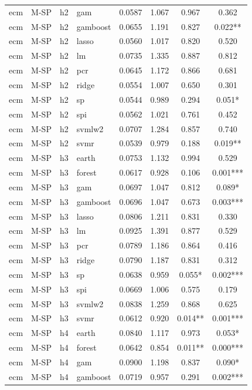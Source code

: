 \begin{ThreePartTable}
\begin{longtable}[t]{llclcccc}
ecm & M-SP & h2 & gam & 0.0587 & 1.067 & 0.967 & 0.362\\
ecm & M-SP & h2 & gamboost & 0.0655 & 1.191 & 0.827 & 0.022**\\
ecm & M-SP & h2 & lasso & 0.0560 & 1.017 & 0.820 & 0.520\\
ecm & M-SP & h2 & lm & 0.0735 & 1.335 & 0.887 & 0.812\\
ecm & M-SP & h2 & pcr & 0.0645 & 1.172 & 0.866 & 0.681\\
ecm & M-SP & h2 & ridge & 0.0554 & 1.007 & 0.650 & 0.301\\
ecm & M-SP & h2 & sp & 0.0544 & 0.989 & 0.294 & 0.051*\\
ecm & M-SP & h2 & spi & 0.0562 & 1.021 & 0.761 & 0.452\\
ecm & M-SP & h2 & svmlw2 & 0.0707 & 1.284 & 0.857 & 0.740\\
ecm & M-SP & h2 & svmr & 0.0539 & 0.979 & 0.188 & 0.019**\\
\addlinespace
ecm & M-SP & h3 & earth & 0.0753 & 1.132 & 0.994 & 0.529\\
ecm & M-SP & h3 & forest & 0.0617 & 0.928 & 0.106 & 0.001***\\
ecm & M-SP & h3 & gam & 0.0697 & 1.047 & 0.812 & 0.089*\\
ecm & M-SP & h3 & gamboost & 0.0696 & 1.047 & 0.673 & 0.003***\\
ecm & M-SP & h3 & lasso & 0.0806 & 1.211 & 0.831 & 0.330\\
ecm & M-SP & h3 & lm & 0.0925 & 1.391 & 0.877 & 0.529\\
ecm & M-SP & h3 & pcr & 0.0789 & 1.186 & 0.864 & 0.416\\
ecm & M-SP & h3 & ridge & 0.0790 & 1.187 & 0.831 & 0.312\\
ecm & M-SP & h3 & sp & 0.0638 & 0.959 & 0.055* & 0.002***\\
ecm & M-SP & h3 & spi & 0.0669 & 1.006 & 0.575 & 0.179\\
ecm & M-SP & h3 & svmlw2 & 0.0838 & 1.259 & 0.868 & 0.625\\
ecm & M-SP & h3 & svmr & 0.0612 & 0.920 & 0.014** & 0.001***\\
\addlinespace
ecm & M-SP & h4 & earth & 0.0840 & 1.117 & 0.973 & 0.053*\\
ecm & M-SP & h4 & forest & 0.0642 & 0.854 & 0.011** & 0.000***\\
ecm & M-SP & h4 & gam & 0.0900 & 1.198 & 0.837 & 0.090*\\
ecm & M-SP & h4 & gamboost & 0.0719 & 0.957 & 0.291 & 0.002***\\

\end{longtable}
\end{ThreePartTable}
